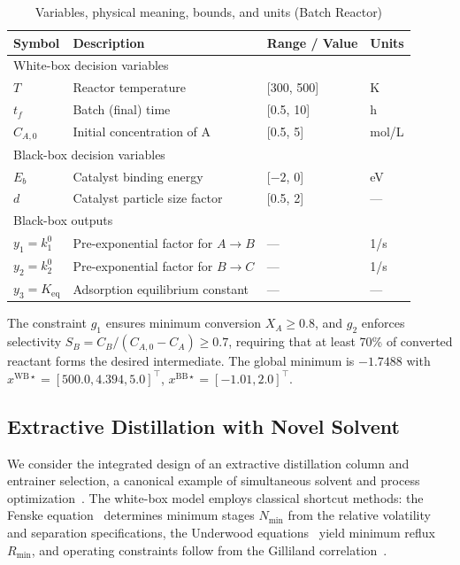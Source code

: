 \documentclass[12pt,a4paper]{article}%
\theoremstyle{plain}%
\theoremstyle{remark}%
\theoremstyle{definition}%
\def\WB{\mathrm{WB}}
\def\BB{\mathrm{BB}}
\begin{document}
\begin{appendices}
\begin{table}[htbp]
\centering
\caption{Variables, physical meaning, bounds, and units (Batch Reactor)}
\label{tab:batch_reactor_vars}
\begin{tabular}{@{}llll@{}}
\toprule
\textbf{Symbol} & \textbf{Description} & \textbf{Range / Value} & \textbf{Units} \\
\midrule
\multicolumn{4}{l}{White-box decision variables} \\
\midrule
$T$ & Reactor temperature & [300, 500] & K \\
$t_f$ & Batch (final) time & [0.5, 10] & h \\
$C_{A,0}$ & Initial concentration of A & [0.5, 5] & mol/L \\
\midrule
\multicolumn{4}{l}{Black-box decision variables} \\
\midrule
$E_b$ & Catalyst binding energy & [$-2$, 0] & eV \\
$d$ & Catalyst particle size factor & [0.5, 2] & --- \\
\midrule
\multicolumn{4}{l}{Black-box outputs} \\
\midrule
$y_1 = k_1^0$ & Pre-exponential factor for $A \to B$ & --- & 1/s \\
$y_2 = k_2^0$ & Pre-exponential factor for $B \to C$ & --- & 1/s \\
$y_3 = K_{\text{eq}}$ & Adsorption equilibrium constant & --- & --- \\
\bottomrule
\end{tabular}
\end{table}

The constraint $g_1$ ensures minimum conversion $X_A \geq 0.8$, and $g_2$ enforces selectivity $S_B = C_B/(C_{A,0} - C_A) \geq 0.7$, requiring that at least 70\% of converted reactant forms the desired intermediate. The global minimum is $-1.7488$ with $x^{\WB\star} = [500.0, 4.394, 5.0]^\top$, $x^{\BB\star} = [-1.01, 2.0]^\top$.

\subsection{Extractive Distillation with Novel Solvent}\label{subsec:app_distillation}

We consider the integrated design of an extractive distillation column and entrainer selection, a canonical example of simultaneous solvent and process optimization~\cite{kossack2008systematic,scheffczyk2018cosmo}. The white-box model employs classical shortcut methods: the Fenske equation~\cite{fenske1932fractionation} determines minimum stages $N_{\min}$ from the relative volatility and separation specifications, the Underwood equations~\cite{underwood1948fractional,kamath2010equation} yield minimum reflux $R_{\min}$, and operating constraints follow from the Gilliland correlation~\cite{gilliland1940multicomponent,grossmann2005optimal}.


\end{appendices}
\end{document}
